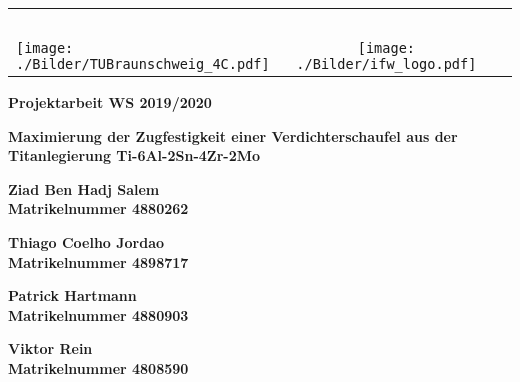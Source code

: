 \begin{titlepage}
 \centering

\begin{table}[htbp]
 \begin{center}
 \vspace{-0.5cm}
  \begin{tabular}{lcr} 
    \parbox{0.45\textwidth}{\mbox{ }} & \parbox{0.13\textwidth}{\mbox{ }} & \parbox{0.45\textwidth}{\mbox{ }} \\
    \hspace*{-2.0cm}
    \texttt{[image: ./Bilder/TUBraunschweig\_4C.pdf]} &		 					\texttt{[image: ./Bilder/ifw\_logo.pdf]} 
       \\ %
  \end{tabular}
 \end{center}
\end{table}


 \vspace*{2.0cm}

 \textbf{\large Projektarbeit WS 2019/2020}


 \vspace*{1.5cm}
 
 \textbf{\LARGE  Maximierung der Zugfestigkeit einer Verdichterschaufel aus der Titanlegierung Ti-6Al-2Sn-4Zr-2Mo} \\[0.5ex]


 \vspace*{1.5cm}

 \textbf{\large Ziad Ben Hadj Salem} \\[0.5ex]
 \textbf{Matrikelnummer 4880262}
 
 \textbf{\large Thiago Coelho Jordao} \\[0.5ex]
 \textbf{Matrikelnummer 4898717}
 
 \textbf{\large Patrick Hartmann} \\[0.5ex]
 \textbf{Matrikelnummer 4880903}

 \textbf{\large Viktor Rein} \\[0.5ex]
 \textbf{Matrikelnummer 4808590}
 

 

 



 \vspace*{2.5cm}


\end{titlepage}

